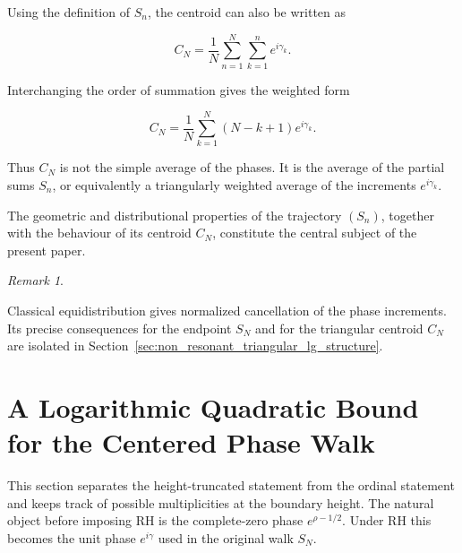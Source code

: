 \documentclass[11pt]{amsart}
\numberwithin{equation}{section}
\theoremstyle{plain}
\theoremstyle{definition}
\theoremstyle{remark}
\newtheorem{remark}[theorem]{Remark}
\begin{document}
Using the definition of \(S_n\), the centroid can also be written as

\begin{equation}
C_N
=
\frac{1}{N}
\sum_{n=1}^{N}
\sum_{k=1}^{n}
e^{i\gamma_k}.
\label{eq:CN_double_sum}
\end{equation}

Interchanging the order of summation gives the weighted form

\begin{equation}
C_N
=
\frac{1}{N}
\sum_{k=1}^{N}
(N-k+1)e^{i\gamma_k}.
\label{eq:CN_weighted}
\end{equation}

Thus \(C_N\) is not the simple average of the phases.
It is the average of the partial sums \(S_n\), or equivalently a
triangularly weighted average of the increments \(e^{i\gamma_k}\).

The geometric and distributional properties of the trajectory
\((S_n)\), together with the behaviour of its centroid \(C_N\),
constitute the central subject of the present paper.

\begin{remark}
\label{rem:equidistribution_not_centroid}

Classical equidistribution gives normalized cancellation of the phase
increments. Its precise consequences for the endpoint \(S_N\) and for the
triangular centroid \(C_N\) are isolated in Section~\ref{sec:non_resonant_triangular_lg_structure}.

\end{remark}

\section{A Logarithmic Quadratic Bound for the Centered Phase Walk}
\label{sec:M0_logarithmic_quadratic_bound}

This section separates the height-truncated statement from the ordinal
statement and keeps track of possible multiplicities at the boundary
height. The natural object before imposing RH is the complete-zero phase
\(e^{\rho-1/2}\). Under RH this becomes the unit phase \(e^{i\gamma}\)
used in the original walk \(S_N\).
\end{document}
